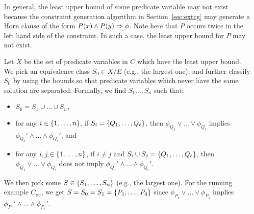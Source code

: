 In general, the least upper bound of some predicate variable may not 
exist because the constraint generation algorithm in 
Section~\ref{sec:extcg} may generate a Horn clause of the form 
\(P(x)\land P(y) \Rightarrow \phi\).  Note here that \(P\) occurs twice in 
the left hand side of the constraint.  In such a case, the least upper 
bound for \(P\) may not exist.

Let \(X\) be the set of predicate variables in \(C\) which have the 
least upper bound.  We pick an equivalence class \(S_0 \in X / E\) (e.g., 
the largest one), and further classify \(S_0\) by using the bounds so 
that predicate variables which never have the same solution are 
separated.
%
Formally, we find \(S_1\dots,S_n\) such that:
\vspace{-4pt}
\begin{itemize}
\item \(S_0 = S_1 \cup \dots \cup S_n\),
\item for any \(i \in \{{1,\dots,n}\}\), if \(S_i
=\{{Q_1,\dots,Q_{\ell}}\}\), then \(\phi_{Q_1} \lor \dots \lor
\phi_{Q_{\ell}}\) implies \(\phi_{Q_1}' \land \dots \land
\phi_{Q_{\ell}}'\), and \item for any \(i,j \in \{{1,\dots,n}\}\), if
\(i \neq j\) and \(S_i \cup S_j = \{{Q_1,\dots,Q_{\ell}}\}\), then
\(\phi_{Q_1} \lor \dots \lor \phi_{Q_{\ell}}\) does not imply
\(\phi_{Q_1}' \land \dots \land \phi_{Q_{\ell}}'\).
\end{itemize}
\vspace{-4pt}
We then pick some \(S \in \{{S_1,\dots,S_n}\}\) (e.g., the largest one).
%
For the running example \(C_{\texttt{cc}}\), we get
\(S=S_0=S_1=\{{P_1,\dots,P_4}\}\) since \(\phi_{P_1} \lor \dots
\lor\phi_{P_4}\) implies \(\phi_{P_1}' \land \dots \land \phi_{P_4}'\).

